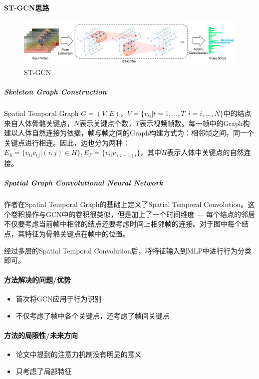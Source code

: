 \paragraph{ST-GCN思路}
\begin{figure}[h]
	\centering
	\includegraphics[width=.8\textwidth]{pics/ST-GCN.png}
	\caption{ST-GCN}
	\label{fig:st-gcn}
\end{figure}
\subparagraph{Skeleton Graph Construction}
Spatial Temporal Graph $G = (V, E)$，$V = \{v_{ti} | t=1, ..., T, i = i, ..., N\}$中的结点来自人体骨骼关键点，$N$表示关键点个数，$T$表示视频帧数。每一帧中的Graph构建以人体自然连接为依据，帧与帧之间的Graph构建方式为：相邻帧之间，同一个关键点进行相连。因此，边也分为两种：$E_S = \{v_{ti}v_{tj} | (i,j) \in H\}, E_F = \{v_{ti}v_{(t+1)i}\}$，其中$H$表示人体中关键点的自然连接。

\subparagraph{Spatial Graph Convolutional Neural Network}
作者在Spatial Temporal Graph的基础上定义了Spatial Temporal Convolution。这个卷积操作与GCN中的卷积很类似，但是加上了一个时间维度 --- 每个结点的邻居不仅要考虑当前帧中相邻的结点还要考虑时间上相邻帧的连接。对于图中每个结点，其特征为骨骼关键点在帧中的位置。

经过多层的Spatial Temporal Convolution后，将特征输入到MLP中进行行为分类即可。

\paragraph{方法解决的问题/优势}

\begin{itemize}

	\item 首次将GCN应用于行为识别
	\item 不仅考虑了帧中各个关键点，还考虑了帧间关键点

\end{itemize}

\paragraph{方法的局限性/未来方向}

\begin{itemize}

	\item 论文中提到的注意力机制没有明显的意义
	\item 只考虑了局部特征

\end{itemize}



